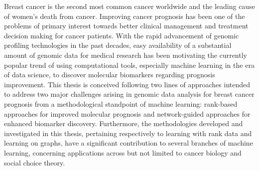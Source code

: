 Breast cancer is the second most common cancer worldwide and the leading cause of women's death from cancer. Improving cancer prognosis has been one of the problems of primary interest towards better clinical management and treatment decision making for cancer patients. With the rapid advancement of genomic profiling technologies in the past decades, easy availability of a substantial amount of genomic data for medical research has been motivating the currently popular trend of using computational tools, especially machine learning in the era of data science, to discover molecular biomarkers regarding prognosis improvement. This thesis is conceived following two lines of approaches intended to address two major challenges arising in genomic data analysis for breast cancer prognosis from a methodological standpoint of machine learning: rank-based approaches for improved molecular prognosis and network-guided approaches for enhanced biomarker discovery. Furthermore, the methodologies developed and investigated in this thesis, pertaining respectively to learning with rank data and learning on graphs, have a significant contribution to several branches of machine learning, concerning applications across but not limited to cancer biology and social choice theory.